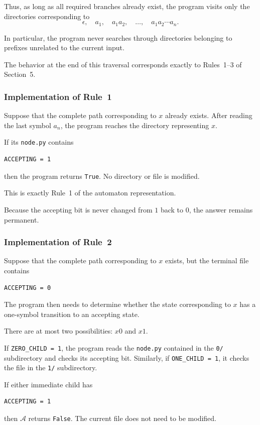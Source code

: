 \documentclass[11pt]{article}
\begin{document}
Thus, as long as all required branches already exist, the program visits
only the directories corresponding to
\[
\epsilon,\quad
a_1,\quad
a_1a_2,\quad
\ldots,\quad
a_1a_2\cdots a_n.
\]

In particular, the program never searches through directories belonging to
prefixes unrelated to the current input.

The behavior at the end of this traversal corresponds exactly to
Rules~1--3 of Section~5.

\subsubsection*{Implementation of Rule~1}

Suppose that the complete path corresponding to \(x\) already exists.
After reading the last symbol \(a_n\), the program reaches the directory
representing \(x\).

If its \texttt{node.py} contains
\begin{verbatim}
ACCEPTING = 1
\end{verbatim}
then the program returns \texttt{True}.  No directory or file is modified.

This is exactly Rule~1 of the automaton representation.

Because the accepting bit is never changed from \(1\) back to \(0\), the
answer remains permanent.

\subsubsection*{Implementation of Rule~2}

Suppose that the complete path corresponding to \(x\) exists, but the
terminal file contains
\begin{verbatim}
ACCEPTING = 0
\end{verbatim}

The program then needs to determine whether the state corresponding to
\(x\) has a one-symbol transition to an accepting state.

There are at most two possibilities: \(x0\) and \(x1\).

If
\texttt{ZERO\_CHILD = 1}, the program reads the
\texttt{node.py} contained in the \texttt{0/} subdirectory and checks its
accepting bit.  Similarly, if
\texttt{ONE\_CHILD = 1}, it checks the file in the \texttt{1/}
subdirectory.

If either immediate child has
\begin{verbatim}
ACCEPTING = 1
\end{verbatim}
then \(\mathcal A\) returns \texttt{False}.  The current file does not need
to be modified.
\end{document}
